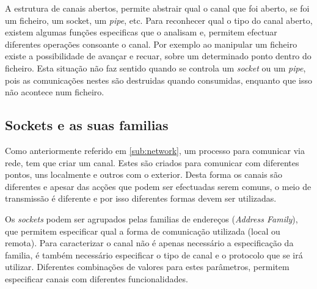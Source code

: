 A estrutura de canais abertos, permite abstrair qual o canal que foi aberto, se foi um ficheiro, um socket, um \textit{pipe}, etc.
Para reconhecer qual o tipo do canal aberto, existem algumas funções especificas que o analisam e, permitem efectuar diferentes operações consoante o canal.
Por exemplo ao manipular um ficheiro existe a possibilidade de avançar e recuar, sobre um determinado ponto dentro do ficheiro.
Esta situação não faz sentido quando se controla um \textit{socket} ou um \textit{pipe}, pois as comunicações nestes são destruidas quando consumidas, enquanto que isso não acontece num ficheiro.
 




\subsection{Sockets e as suas familias}
\label{sub:sockets}

Como anteriormente referido em \ref{sub:network}, um processo para comunicar via rede, tem que criar um canal.
Estes são criados para comunicar com diferentes pontos, uns localmente e outros com o exterior.
Desta forma os canais são diferentes e apesar das acções que podem ser efectuadas serem comuns, o meio de transmissão é diferente e por isso diferentes formas devem ser utilizadas.

Os \textit{sockets} podem ser agrupados pelas familias de endereços (\textit{Address Family}), que permitem especificar qual a forma de comunicação utilizada (local ou remota).
Para caracterizar o canal não é apenas necessário a especificação da familia, é também necessário especificar o tipo de canal e o protocolo que se irá utilizar.
Diferentes combinações de valores para estes parâmetros, permitem especificar canais com diferentes funcionalidades.

